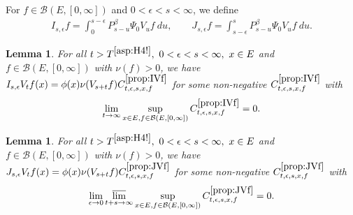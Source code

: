 \documentclass[12pt,a4paper]{amsart}
\numberwithin{equation}{section}
\theoremstyle{plain}
\newtheorem{lem}[thm]{Lemma}
\theoremstyle{definition}
\theoremstyle{remark}
\begin{document}
For $f\in \mathcal B(E,[0,\infty])$ and $0 < \epsilon < s < \infty$, we define
\begin{align}
	I_{s,\epsilon} f
 	= \int_0^{s - \epsilon} P_{s - u}^\beta \Psi_0 V_u f ~du, \qquad
 	J_{s,\epsilon} f
 	= \int_{s-\epsilon}^s P_{s-u}^\beta \Psi_0 V_u f ~du.
\end{align}
\begin{lem} \label{prop:IVf}
	For all $t> T^{\eqref{asp:H4!}},~0<\epsilon<s< \infty,~x\in E$ and $f\in \mathcal B(E,[0,\infty])$ with $\nu(f)>0$, we have $I_{s,\epsilon}V_t f(x) = \phi(x) \nu(V_{s+t} f) C^{\ref{prop:IVf}}_{t,\epsilon, s, x,f}$ for some non-negative $C^{\ref{prop:IVf}}_{t,\epsilon, s, x,f}$ with
\[
\lim_{t\to \infty} \sup_{x\in E, f\in \mathcal B(E,[0,\infty])}
C^{\ref{prop:IVf}}_{t,\epsilon, s, x,f} = 0.
\]
\end{lem}

\begin{lem} \label{prop:JVf}
For all $t>T^{\eqref{asp:H4!}},~0<\epsilon<s< \infty,~x\in E$ and $f\in \mathcal B(E,[0,\infty])$ with $\nu(f)>0$, we have $ J_{s,\epsilon} V_tf(x) = \phi(x) \nu(V_{s+t}f) C^{\ref{prop:JVf}}_{t,\epsilon,s,x,f}$ for some non-negative $C^{\ref{prop:JVf}}_{t,\epsilon,s,x,f}$ with
\[
\lim_{\epsilon \to 0}\varlimsup_{t+s\to \infty}
\sup_{x\in E, f\in \mathcal B(E,[0,\infty])}
C^{\ref{prop:JVf}}_{t,\epsilon,s,x,f} =0.
\]
\end{lem}
\end{document}

